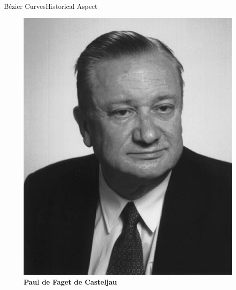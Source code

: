 \documentclass[10pt]{beamer}
\begin{document}
\begin{frame}{Bézier Curves}{Historical Aspect}
{\begin{figure}[H]
\begin{minipage}[top]{0.50\linewidth}
    \end{minipage}

  \hspace{6.5cm}
    \begin{minipage}[top]{0.30\linewidth}
      \vspace{-3cm}
      \hspace{10cm}
      \centering
      \includegraphics[scale=0.1]{Paul.png}
      \textbf{Paul de Faget de Casteljau \footnotemark[2]}
    \end{minipage}
  
    \end{figure}}

    \vspace{-2cm}
\end{frame}
\end{document}
